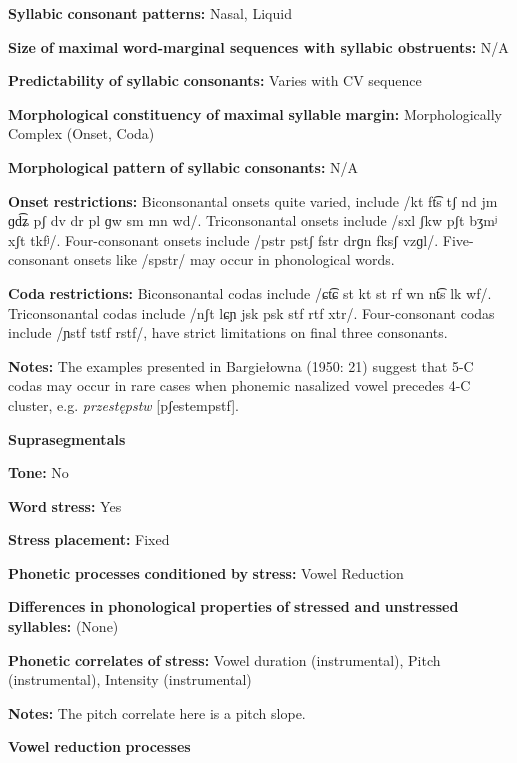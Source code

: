 \textbf{Syllabic} \textbf{consonant} \textbf{patterns:} Nasal, Liquid

\textbf{Size} \textbf{of} \textbf{maximal} \textbf{word{}-marginal sequences with syllabic obstruents:} N/A

\textbf{Predictability} \textbf{of} \textbf{syllabic} \textbf{consonants:} Varies with CV sequence

\textbf{Morphological} \textbf{constituency} \textbf{of} \textbf{maximal} \textbf{syllable} \textbf{margin:} Morphologically Complex (Onset, Coda)

\textbf{Morphological} \textbf{pattern} \textbf{of} \textbf{syllabic} \textbf{consonants:} N/A

\textbf{Onset} \textbf{restrictions:} Biconsonantal onsets quite varied, include /kt ft͡s tʃ nd jm ɡd͡ʑ pʃ dv dr pl ɡw sm mn wd/. Triconsonantal onsets include /sxl ʃkw pʃt bʒmʲ xʃt tkfʲ/. Four-consonant onsets include /pstr pstʃ fstr drɡn fksʃ vzɡl/. Five-consonant onsets like /spstr/ may occur in phonological words.

\textbf{Coda} \textbf{restrictions:} Biconsonantal codas include /ɕt͡ɕ st kt st rf wn nt͡s lk wf/. Triconsonantal codas include /nʃt lɕɲ jsk psk stf rtf xtr/. Four-consonant codas include /ɲstf tstf rstf/, have strict limitations on final three consonants.

\textbf{Notes:} The examples presented in Bargiełowna (1950: 21) suggest that 5-C codas may occur in rare cases when phonemic nasalized vowel precedes 4-C cluster, e.g. \textit{przestępstw} [pʃestempstf].

\textbf{Suprasegmentals}

\textbf{Tone:} No

\textbf{Word} \textbf{stress:} Yes

\textbf{Stress} \textbf{placement:} Fixed

\textbf{Phonetic} \textbf{processes} \textbf{conditioned} \textbf{by} \textbf{stress:} Vowel Reduction

\textbf{Differences} \textbf{in} \textbf{phonological} \textbf{properties} \textbf{of} \textbf{stressed} \textbf{and} \textbf{unstressed} \textbf{syllables:} (None)

\textbf{Phonetic} \textbf{correlates} \textbf{of} \textbf{stress:} Vowel duration (instrumental), Pitch (instrumental), Intensity (instrumental)

\textbf{Notes:} The pitch correlate here is a pitch slope.

\textbf{Vowel} \textbf{reduction} \textbf{processes}

